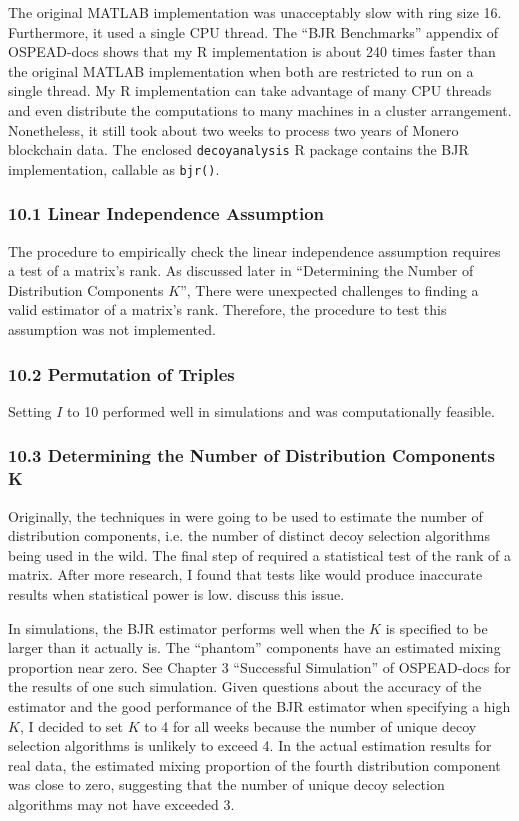 \documentclass[english]{article}
\begin{document}
The original MATLAB implementation was unacceptably slow with ring
size 16. Furthermore, it used a single CPU thread. The ``BJR Benchmarks''
appendix of OSPEAD-docs shows that my R implementation is about 240
times faster than the original MATLAB implementation when both are
restricted to run on a single thread. My R implementation can take
advantage of many CPU threads and even distribute the computations
to many machines in a cluster arrangement. Nonetheless, it still took
about two weeks to process two years of Monero blockchain data. The
enclosed \texttt{decoyanalysis} R package contains the BJR implementation,
callable as \texttt{bjr()}.

\subsubsection*{10.1 Linear Independence Assumption}

The procedure to empirically check the linear independence assumption
requires a test of a matrix's rank. As discussed later in ``Determining
the Number of Distribution Components $K$'', There were unexpected
challenges to finding a valid estimator of a matrix's rank. Therefore,
the procedure to test this assumption was not implemented.

\subsubsection*{10.2 Permutation of Triples}

Setting $I$ to 10 performed well in simulations and was computationally
feasible.

\subsubsection*{10.3 Determining the Number of Distribution Components K}

Originally, the techniques in \cite{KasaharaShimotsu2014} were going
to be used to estimate the number of distribution components, i.e.
the number of distinct decoy selection algorithms being used in the
wild. The final step of \cite{KasaharaShimotsu2014} required a statistical
test of the rank of a matrix. After more research, I found that tests
like \cite{KasaharaShimotsu2014} would produce inaccurate results
when statistical power is low. \cite{ChenFang2019} discuss this issue. 

In simulations, the BJR estimator performs well when the $K$ is specified
to be larger than it actually is. The ``phantom'' components have
an estimated mixing proportion near zero. See Chapter 3 ``Successful
Simulation'' of OSPEAD-docs for the results of one such simulation.
Given questions about the accuracy of the \cite{KasaharaShimotsu2014}
estimator and the good performance of the BJR estimator when specifying
a high $K$, I decided to set $K$ to 4 for all weeks because the
number of unique decoy selection algorithms is unlikely to exceed
4. In the actual estimation results for real data, the estimated mixing
proportion of the fourth distribution component was close to zero,
suggesting that the number of unique decoy selection algorithms may
not have exceeded 3.
\end{document}

